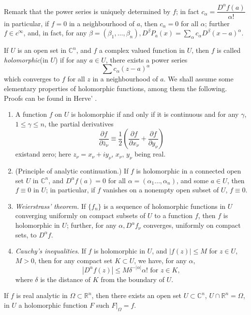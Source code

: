 Remark that the power series is uniquely determined by $f$; in fact
$c_{\alpha}= \dfrac{D^{\alpha} f(a)}{\alpha !}$ in particular, if $f
=0$ in a neighbourhood of $a$, then $c_{\alpha} = 0$ for all $\alpha$;
further $f \in c^{\infty}$, and, in fact, for any $\beta = (\beta_1,
\ldots , \beta_n), D^{\beta} P_a(x) = \sum \limits_{\alpha} c_{\alpha}
D^{\beta} (x-a)^{\alpha}$. 

If $U$ is an open set in $\mathbb{C}^n$, and $f$ a complex valued
function in $U$, then $f$ is called \textit{holomorphic}(in $U$) if
for any $a \in U$, there exists a power series  
$$
\sum c_{\alpha} (z-a)^{\alpha}
$$
which converges to $f$ for all $z$ in a neighbourhood of $a$. We shall
assume some elementary properties of holomorphic functions, among them
the following. Proofs can be found in Herve' \cite{14}. 
\begin{enumerate}[1]
\item A function $f$ on $U$ is holomorphic if and only if it is
  continuous and for any $\gamma$, $1\leq \gamma \leq n$, the partial
  derivatives  
  $$
  \frac{\partial f} {\partial \bar{z}_{\nu}} \equiv \frac{1}{2}
  (\frac{\partial f} {\partial x_{\nu}} + \frac{\partial f} {\partial
    y_{\nu}}) 
  $$
  exist\pageoriginale and zero; here $z_{\nu} = x_{\nu} + i y_{\nu}$, $x_{\nu}$, $y_{\nu}$ being real.
\item (Principle of analytic continuation.) If $f$ is holomorphic in a
  connected open set $U$ in $\mathbb{C}^n$, and $D^{\alpha} f(a) = 0$
  for all $\alpha =(\alpha_1 \ldots, \alpha_n)$, and some $a \in U$,
  then $f \equiv 0$ in $U$; in particular, if $f$ vanishes on a
  nonempty open subset of $U$, $f \equiv 0$. 
\item \textit{Weierstrass' theorem.} If $\{f_n \}$ is a sequence of
  holomorphic functions in $U$ converging uniformly on compact subsets
  of $U$ to a function $f$, then $f$ is holomorphic in $U$; further,
  for any $\alpha, D^{\alpha} f_{\nu}$ converges, uniformly on compact
  sets, to $D^{\alpha} f$. 
\item \textit{Cauchy's inequalities}. If $f$ is holomorphic in $U$,
  and $|f(z)| \leq M$ for $z \in U$, $M > 0$, then for any compact set
  $K \subset U$, we have, for any $\alpha$, 
  $$
  |D^{\alpha}f(z) | \leq M \delta^{-|\alpha|} \alpha ! \text{ for } z \in K,
  $$
  where $\delta$ is the distance of $K$ from the boundary of $U$.
\end{enumerate} 

\begin{lemma}\label{chap1:sec1:lem1} %
  If $f$ is real analytic in $\Omega \subset \mathbb{R}^n$, then there
  exists an open set $U \subset \mathbb{C}^n$, $U \cap \mathbb{R}^n =
  \Omega$, in $U$ a holomorphic function $F$ such $F|_\Omega = f$. 
\end{lemma}

